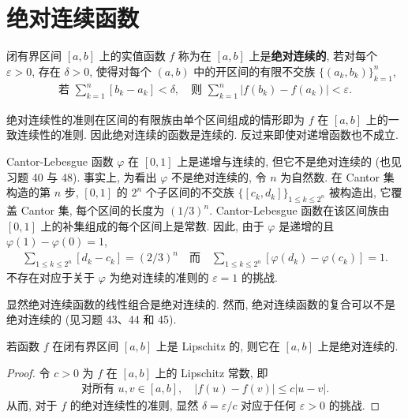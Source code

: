 \documentclass[../../main.tex]{subfiles}
\begin{document}
\section{绝对连续函数}\label{section:ch06-绝对连续}

\begin{definition}[绝对连续]\label{definition:ch06-绝对连续}
闭有界区间 $[a,b]$ 上的实值函数 $f$ 称为在 $[a,b]$ 上是\textbf{绝对连续的}, 若对每个 $\varepsilon>0$, 存在 $\delta>0$, 使得对每个 $(a,b)$ 中的开区间的有限不交族 $\{(a_{k},b_{k})\}_{k=1}^{n}$,
\begin{align*}
\text{若 }\sum_{k=1}^{n}[b_{k}-a_{k}]<\delta,\quad\text{则 }\sum_{k=1}^{n}|f(b_{k})-f(a_{k})|<\varepsilon.
\end{align*}
\end{definition}

绝对连续性的准则在区间的有限族由单个区间组成的情形即为 $f$ 在 $[a,b]$ 上的一致连续性的准则. 因此绝对连续的函数是连续的. 反过来即使对递增函数也不成立.

\begin{example}\label{example:ch06-Cantor-Lebesgue}
Cantor-Lebesgue 函数 $\varphi$ 在 $[0,1]$ 上是递增与连续的, 但它不是绝对连续的 (也见习题 40 与 48). 事实上, 为看出 $\varphi$ 不是绝对连续的, 令 $n$ 为自然数. 在 Cantor 集构造的第 $n$ 步, $[0,1]$ 的 $2^{n}$ 个子区间的不交族 $\{[c_{k},d_{k}]\}_{1\leqslant k\leqslant 2^{n}}$ 被构造出, 它覆盖 Cantor 集, 每个区间的长度为 $(1/3)^{n}$. Cantor-Lebesgue 函数在该区间族由 $[0,1]$ 上的补集组成的每个区间上是常数. 因此, 由于 $\varphi$ 是递增的且 $\varphi(1)-\varphi(0)=1$,
\begin{align*}
\sum_{1\leqslant k\leqslant 2^{n}}[d_{k}-c_{k}]=(2/3)^{n}\quad\text{而}\quad\sum_{1\leqslant k\leqslant 2^{n}}[\varphi(d_{k})-\varphi(c_{k})]=1.
\end{align*}
不存在对应于关于 $\varphi$ 为绝对连续的准则的 $\varepsilon=1$ 的挑战.

显然绝对连续函数的线性组合是绝对连续的. 然而, 绝对连续函数的复合可以不是绝对连续的 (见习题 43、44 和 45).
\end{example}

\begin{proposition}\label{proposition:ch06-Lipschitz绝对连续}
若函数 $f$ 在闭有界区间 $[a,b]$ 上是 Lipschitz 的, 则它在 $[a,b]$ 上是绝对连续的.
\end{proposition}

\begin{proof}
令 $c>0$ 为 $f$ 在 $[a,b]$ 上的 Lipschitz 常数, 即
\begin{align*}
\text{对所有 }u,v\in[a,b],\quad|f(u)-f(v)|\leqslant c|u-v|.
\end{align*}
从而, 对于 $f$ 的绝对连续性的准则, 显然 $\delta=\varepsilon/c$ 对应于任何 $\varepsilon>0$ 的挑战.
\end{proof}
\end{document}
